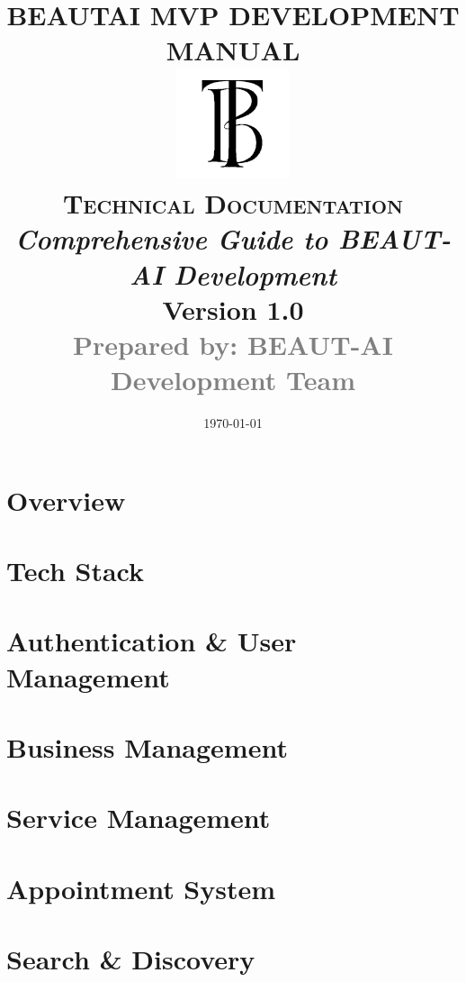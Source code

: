 \documentclass{article}
\title{
    \vspace{2cm}  
    {\Huge\bfseries BEAUTAI MVP DEVELOPMENT MANUAL} \\
    \vspace{1.5cm}
    \includegraphics[width=0.25\textwidth]{logo.png} \\
    \vspace{1.5cm}
    {\Large\scshape Technical Documentation} \\
    \vspace{0.5cm}
    {\itshape Comprehensive Guide to BEAUT-AI Development} \\
    \vspace{1.5cm}
    {\large\bfseries Version 1.0} \\
    \vspace{0.5cm}
    \textcolor{gray}{\large Prepared by: BEAUT-AI Development Team} \\

}
\author{}
\date{\today}
\begin{document}
\maketitle
\thispagestyle{empty}

\newpage

\tableofcontents
\thispagestyle{empty}

\newpage

\setcounter{page}{1}
\pagestyle{fancy}
\fancyhf{}
\fancyfoot[C]{\thepage}

\newpage
\section{Overview}


% 

\section{Tech Stack}


\section{Authentication \& User Management}


\section{Business Management}


\section{Service Management}


\section{Appointment System}


\section{Search \& Discovery}

\end{document}
